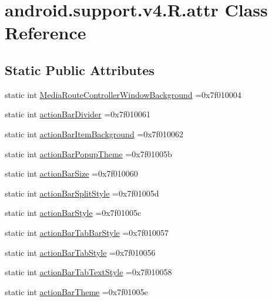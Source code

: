 \hypertarget{classandroid_1_1support_1_1v4_1_1R_1_1attr}{}\section{android.\+support.\+v4.\+R.\+attr Class Reference}
\label{classandroid_1_1support_1_1v4_1_1R_1_1attr}
\subsection*{Static Public Attributes}
\begin{DoxyCompactItemize}
\item 
static int \hyperlink{classandroid_1_1support_1_1v4_1_1R_1_1attr_a0c86276ac1a506b1153d2eaeb2023ac0}{Media\+Route\+Controller\+Window\+Background} =0x7f010004
\item 
static int \hyperlink{classandroid_1_1support_1_1v4_1_1R_1_1attr_a1bf91491acf275f74ac54e879a7b901d}{action\+Bar\+Divider} =0x7f010061
\item 
static int \hyperlink{classandroid_1_1support_1_1v4_1_1R_1_1attr_ade0a8e19fe51b03f278175172436a2f5}{action\+Bar\+Item\+Background} =0x7f010062
\item 
static int \hyperlink{classandroid_1_1support_1_1v4_1_1R_1_1attr_a3016742eee7a92b95fbccce06beffd5b}{action\+Bar\+Popup\+Theme} =0x7f01005b
\item 
static int \hyperlink{classandroid_1_1support_1_1v4_1_1R_1_1attr_a1d83594440797e711b748e5b66c2852d}{action\+Bar\+Size} =0x7f010060
\item 
static int \hyperlink{classandroid_1_1support_1_1v4_1_1R_1_1attr_a442d9e8d1cd653250cbaca93d98a358b}{action\+Bar\+Split\+Style} =0x7f01005d
\item 
static int \hyperlink{classandroid_1_1support_1_1v4_1_1R_1_1attr_ae9b3b2a13897661ab26f944cc22d5ace}{action\+Bar\+Style} =0x7f01005c
\item 
static int \hyperlink{classandroid_1_1support_1_1v4_1_1R_1_1attr_a958603508e58d4d05007fecfa875a0f0}{action\+Bar\+Tab\+Bar\+Style} =0x7f010057
\item 
static int \hyperlink{classandroid_1_1support_1_1v4_1_1R_1_1attr_aa87769ae4e0a2ee72da926a6cd712b3e}{action\+Bar\+Tab\+Style} =0x7f010056
\item 
static int \hyperlink{classandroid_1_1support_1_1v4_1_1R_1_1attr_a75300bda33f07c53e6884aa5ba0c739e}{action\+Bar\+Tab\+Text\+Style} =0x7f010058
\item 
static int \hyperlink{classandroid_1_1support_1_1v4_1_1R_1_1attr_a7324d49e9fadad73f4d0c0a49f02fbcc}{action\+Bar\+Theme} =0x7f01005e

\end{DoxyCompactItemize}
